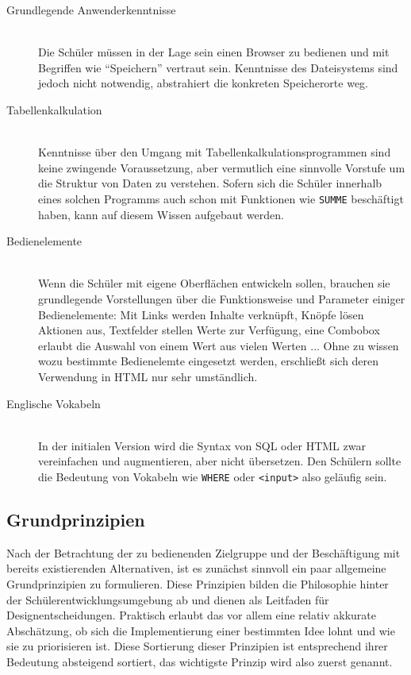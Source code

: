 \begin{description}
\item[Grundlegende Anwenderkenntnisse] \hfill\\
  Die Schüler müssen in der Lage sein einen Browser zu bedienen und mit Begriffen wie "`Speichern"' vertraut sein. Kenntnisse des Dateisystems sind jedoch nicht notwendig, \idename abstrahiert die konkreten Speicherorte weg.
\item[Tabellenkalkulation] \hfill\\
  Kenntnisse über den Umgang mit Tabellenkalkulationsprogrammen sind keine zwingende Voraussetzung, aber vermutlich eine sinnvolle Vorstufe um die Struktur von Daten zu verstehen. Sofern sich die Schüler innerhalb eines solchen Programms auch schon mit Funktionen wie \lstinline{SUMME} beschäftigt haben, kann auf diesem Wissen aufgebaut werden.
\item[Bedienelemente] \hfill\\
  Wenn die Schüler mit \idename eigene Oberflächen entwickeln sollen, brauchen sie grundlegende Vorstellungen über die Funktionsweise und Parameter einiger Bedienelemente: Mit Links werden Inhalte verknüpft, Knöpfe lösen Aktionen aus, Textfelder stellen Werte zur Verfügung, eine Combobox erlaubt die Auswahl von einem Wert aus vielen Werten ... Ohne zu wissen wozu bestimmte Bedienelemte eingesetzt werden, erschließt sich deren Verwendung in HTML nur sehr umständlich.
\item[Englische Vokabeln] \hfill\\
  In der initialen Version wird \idename die Syntax von SQL oder HTML zwar vereinfachen und augmentieren, aber nicht übersetzen. Den Schülern sollte die Bedeutung von Vokabeln wie \lstinline{WHERE} oder \lstinline{<input>} also geläufig sein.
\end{description}

\subsection{Grundprinzipien}
\label{sec:principles}

Nach der Betrachtung der zu bedienenden Zielgruppe und der Beschäftigung mit bereits existierenden Alternativen, ist es zunächst sinnvoll ein paar allgemeine Grundprinzipien zu formulieren. Diese Prinzipien bilden die Philosophie hinter der Schülerentwicklungsumgebung ab und dienen als Leitfaden für Designentscheidungen. Praktisch erlaubt das vor allem eine relativ akkurate Abschätzung, ob sich die Implementierung einer bestimmten Idee lohnt und wie sie zu priorisieren ist. Diese Sortierung dieser Prinzipien ist entsprechend ihrer Bedeutung absteigend sortiert, das wichtigste Prinzip wird also zuerst genannt.

